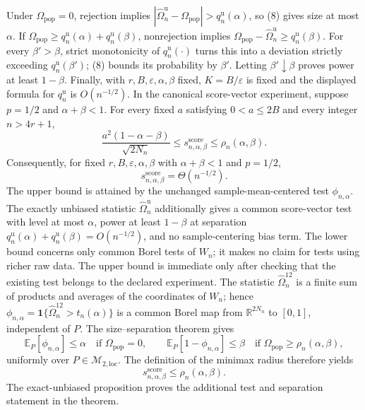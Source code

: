 Under \(\Omega_{\mathrm{pop}}=0\), rejection implies
\(|\widehat\Omega_n^{\mathrm u}-\Omega_{\mathrm{pop}}|>q_n^{\mathrm u}(\alpha)\), so (8) gives size at most \(\alpha\).  If
\(\Omega_{\mathrm{pop}}\ge q_n^{\mathrm u}(\alpha)+q_n^{\mathrm u}(\beta)\), nonrejection implies
\(\Omega_{\mathrm{pop}}-\widehat\Omega_n^{\mathrm u}\ge q_n^{\mathrm u}(\beta)\).  For every \(\beta'>\beta\), strict monotonicity of \(q_n^{\mathrm u}(\cdot)\) turns this into a deviation strictly exceeding \(q_n^{\mathrm u}(\beta')\); (8) bounds its probability by \(\beta'\).  Letting \(\beta'\downarrow\beta\) proves power at least \(1-\beta\).  Finally, with \(r,B,\varepsilon,\alpha,\beta\) fixed, \(K=B/\varepsilon\) is fixed and the displayed formula for \(q_n^{\mathrm u}\) is \(O(n^{-1/2})\).
In the canonical score-vector experiment, suppose \(p=1/2\) and \(\alpha+\beta<1\).  For every fixed \(a\) satisfying \(0<a\le2B\) and every integer \(n>4r+1\),
\[
 \frac{a^2(1-\alpha-\beta)}{\sqrt{2N_n}}
 \le s_{n,\alpha,\beta}^{\mathrm{score}}
 \le \rho_n(\alpha,\beta).
\]
Consequently, for fixed \(r,B,\varepsilon,\alpha,\beta\) with \(\alpha+\beta<1\) and \(p=1/2\),
\[
 s_{n,\alpha,\beta}^{\mathrm{score}}=\Theta(n^{-1/2}).
\]
The upper bound is attained by the unchanged sample-mean-centered test \(\phi_{n,\alpha}\).  The exactly unbiased statistic \(\widehat\Omega_n^{\mathrm u}\) additionally gives a common score-vector test with level at most \(\alpha\), power at least \(1-\beta\) at separation \(q_n^{\mathrm u}(\alpha)+q_n^{\mathrm u}(\beta)=O(n^{-1/2})\), and no sample-centering bias term.  The lower bound concerns only common Borel tests of \(W_n\); it makes no claim for tests using richer raw data.
The upper bound is immediate only after checking that the existing test belongs to the declared experiment.  The statistic \(\widehat\Omega_n^{12}\) is a finite sum of products and averages of the coordinates of \(W_n\); hence
\(\phi_{n,\alpha}=\mathbf 1\{\widehat\Omega_n^{12}>t_n(\alpha)\}\)
is a common Borel map from \(\mathbb R^{2N_n}\) to \([0,1]\), independent of \(P\).  The size--separation theorem gives
\[
 \mathbb E_P[\phi_{n,\alpha}]
 \le\alpha\quad\text{if }\Omega_{\mathrm{pop}}=0,
 \qquad
 \mathbb E_P[1-\phi_{n,\alpha}]
 \le\beta\quad\text{if }\Omega_{\mathrm{pop}}\ge\rho_n(\alpha,\beta),
\]
uniformly over \(P\in\mathcal M_{2,\mathrm{loc}}\).  The definition of the minimax radius therefore yields
\[
 s_{n,\alpha,\beta}^{\mathrm{score}}\le\rho_n(\alpha,\beta). \tag{1}
\]
The exact-unbiased proposition proves the additional test and separation statement in the theorem.

